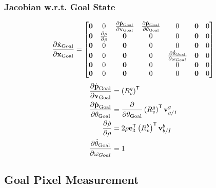 \subsubsection{Jacobian w.r.t. Goal State}
\begin{equation}
  \frac{\partial \dot{\boldsymbol{\mathrm{x}}}_{\text{Goal}}}{\partial \boldsymbol{\mathrm{x}}_{\text{Goal}}}
  =
  \begin{bmatrix}
    \boldsymbol{\mathrm{0}} & 0 & \frac{\partial \dot{\boldsymbol{\mathrm{p}}}_{\text{Goal}}}{\partial
      \boldsymbol{\mathrm{v}}_{\text{Goal}}} & \frac{\partial
      \dot{\boldsymbol{\mathrm{p}}}_{\text{Goal}}}{\partial \theta_{\text{Goal}}} & 0 & \boldsymbol{\mathrm{0}} & 0 \\
    \boldsymbol{\mathrm{0}} & \frac{\partial \dot{\rho}}{\partial \rho} & \boldsymbol{\mathrm{0}} & 0 & 0
             & \boldsymbol{\mathrm{0}} & 0 \\
    \boldsymbol{\mathrm{0}} & 0 & \boldsymbol{\mathrm{0}} & 0 & 0 & \boldsymbol{\mathrm{0}} & 0 \\
    \boldsymbol{\mathrm{0}} & 0 & \boldsymbol{\mathrm{0}} & 0 & \frac{\partial
      \dot{\theta}_{\text{Goal}}}{\partial \omega_{Goal}} & \boldsymbol{\mathrm{0}} & 0 \\
    \boldsymbol{\mathrm{0}} & 0 & \boldsymbol{\mathrm{0}} & 0 & 0 & \boldsymbol{\mathrm{0}} & 0 \\
    \boldsymbol{\mathrm{0}} & 0 & \boldsymbol{\mathrm{0}} & 0 & 0 & \boldsymbol{\mathrm{0}} & 0
  \end{bmatrix}
\end{equation}
\begin{align}
    \frac{\partial \dot{\boldsymbol{\mathrm{p}}}_{\text{Goal}}}{\partial
      \boldsymbol{\mathrm{v}}_{\text{Goal}}}
      &=
      \left(R_{v}^{g}\right)^{\mathsf{T}}
      \\
    \frac{\partial \dot{\boldsymbol{\mathrm{p}}}_{\text{Goal}}}{\partial \theta_{\text{Goal}}}
      &=
      \frac{\partial}{\partial \theta_{\text{Goal}}} \left(R_{v}^{g}\right)^{\mathsf{T}} \boldsymbol{\mathrm{v}}_{g/I}^{g}
      \\
    \frac{\partial \dot{\rho}}{\partial \rho}
      &=
      2 \rho \boldsymbol{\mathrm{e}}_{3}^{\mathsf{T}} \left(R_{v}^{b}\right)^{\mathsf{T}} \boldsymbol{\mathrm{v}}_{b/I}^{b}
      \\
    \frac{\partial \dot{\theta}_{\text{Goal}}}{\partial \omega_{Goal}}
      &=
      1
\end{align}

\subsection{Goal Pixel Measurement}
